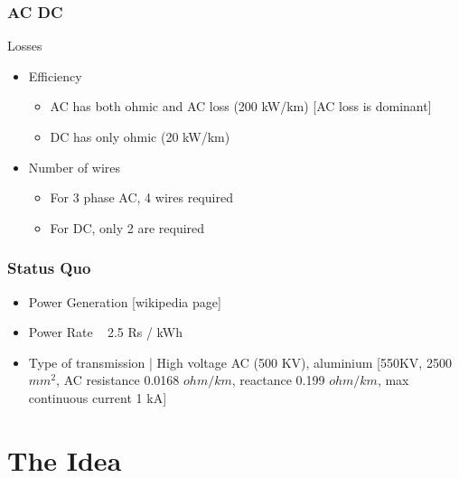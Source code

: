 \documentclass{beamer}
\begin{document}
		\begin{frame}
			\frametitle{AC DC}
				Losses
				\begin{itemize}
					\item Efficiency
						\begin{itemize}
							\item AC has both ohmic and AC loss (200 kW/km) [AC loss is dominant]
							\item DC has only ohmic (20 kW/km)
						\end{itemize}
					\item Number of wires
						\begin{itemize}
							\item For 3 phase AC, 4 wires required
							\item For DC, only 2 are required
						\end{itemize}
				\end{itemize}
		\end{frame}

		\begin{frame}
			\frametitle{Status Quo}
				\begin{itemize}
					\item Power Generation [wikipedia page]
					\item Power Rate ~ 2.5 Rs / kWh
					\item Type of transmission | High voltage AC (500 KV), aluminium [550KV, 2500 $mm^2$, AC resistance 0.0168 $ohm/km$, reactance 0.199 $ohm/km$, max continuous current 1 kA]
				\end{itemize}
		\end{frame}



\section{The Idea}
	
\end{document}
